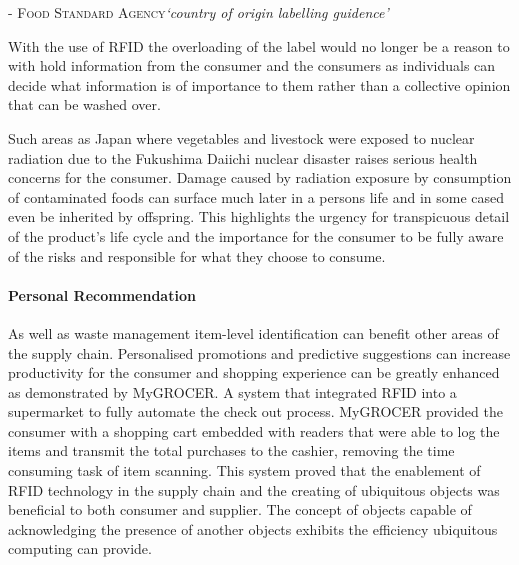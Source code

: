 \documentclass[a4paper, 11pt]{article}
\begin{document}
 {\textsc{- Food Standard Agency}\textit{`country of origin labelling guidence'}
\vspace{\baselineskip}

%
With the use of RFID the overloading of the label would no longer be a reason to with hold information from the consumer and the consumers as individuals can decide what information is of importance to them rather than a collective opinion that can be washed over.
%

Such areas as Japan where vegetables and livestock were exposed to nuclear radiation due to the Fukushima Daiichi nuclear disaster raises serious health concerns for the consumer. Damage caused by radiation exposure by consumption of contaminated foods can surface much later in a persons life\cite{fukushima} and in some cased even be inherited by offspring. This highlights the urgency for transpicuous detail of the product's life cycle and the importance for the consumer to be fully aware of the risks and responsible for what they choose to consume.

\paragraph{Personal Recommendation} As well as waste management item-level identification can benefit other areas of the supply chain. Personalised promotions and predictive suggestions can increase productivity for the consumer and shopping experience can be greatly enhanced as demonstrated by MyGROCER\cite{myGrocer}. A system that integrated RFID into a supermarket to fully automate the check out process. MyGROCER provided the consumer with a shopping cart embedded with readers that were able to log the items and transmit the total purchases to the cashier, removing the time consuming task of item scanning. This system proved that the enablement of RFID technology in the supply chain and the creating of ubiquitous objects was beneficial to both consumer and supplier. The concept of objects capable of acknowledging the presence of another objects exhibits the efficiency ubiquitous computing can provide.

}
\end{document}
